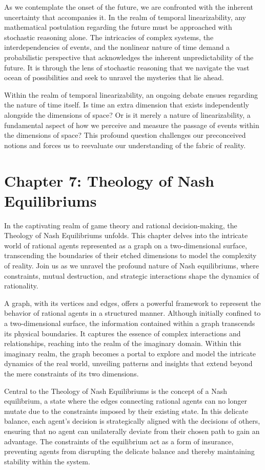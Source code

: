 \documentclass[ebook,12pt,oneside,openany]{memoir}
\begin{document}
\indent As we contemplate the onset of the future, we are confronted with the inherent uncertainty that accompanies it. In the realm of temporal linearizability, any mathematical postulation regarding the future must be approached with stochastic reasoning alone. The intricacies of complex systems, the interdependencies of events, and the nonlinear nature of time demand a probabilistic perspective that acknowledges the inherent unpredictability of the future. It is through the lens of stochastic reasoning that we navigate the vast ocean of possibilities and seek to unravel the mysteries that lie ahead.

\indent Within the realm of temporal linearizability, an ongoing debate ensues regarding the nature of time itself. Is time an extra dimension that exists independently alongside the dimensions of space? Or is it merely a nature of linearizability, a fundamental aspect of how we perceive and measure the passage of events within the dimensions of space? This profound question challenges our preconceived notions and forces us to reevaluate our understanding of the fabric of reality.
\chapter*{Chapter 7: Theology of Nash Equilibriums}


\indent \indent In the captivating realm of game theory and rational decision-making, the Theology of Nash Equilibriums unfolds. This chapter delves into the intricate world of rational agents represented as a graph on a two-dimensional surface, transcending the boundaries of their etched dimensions to model the complexity of reality. Join us as we unravel the profound nature of Nash equilibriums, where constraints, mutual destruction, and strategic interactions shape the dynamics of rationality.

\indent A graph, with its vertices and edges, offers a powerful framework to represent the behavior of rational agents in a structured manner. Although initially confined to a two-dimensional surface, the information contained within a graph transcends its physical boundaries. It captures the essence of complex interactions and relationships, reaching into the realm of the imaginary domain. Within this imaginary realm, the graph becomes a portal to explore and model the intricate dynamics of the real world, unveiling patterns and insights that extend beyond the mere constraints of its two dimensions.

\indent Central to the Theology of Nash Equilibriums is the concept of a Nash equilibrium, a state where the edges connecting rational agents can no longer mutate due to the constraints imposed by their existing state. In this delicate balance, each agent's decision is strategically aligned with the decisions of others, ensuring that no agent can unilaterally deviate from their chosen path to gain an advantage. The constraints of the equilibrium act as a form of insurance, preventing agents from disrupting the delicate balance and thereby maintaining stability within the system.
\end{document}
